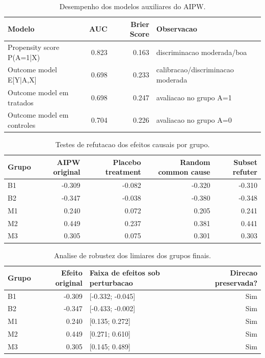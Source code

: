 \begin{table}[htbp]
\centering
\small
\caption{Desempenho dos modelos auxiliares do AIPW.}
\label{tab:nuisance_models}
\begin{tabular}{lrrl}
\toprule
Modelo & AUC & Brier Score & Observacao \\
\midrule
Propensity score P(A=1|X) & 0.823 & 0.163 & discriminacao moderada/boa \\
Outcome model E[Y|A,X] & 0.698 & 0.233 & calibracao/discriminacao moderada \\
Outcome model em tratados & 0.698 & 0.247 & avaliacao no grupo A=1 \\
Outcome model em controles & 0.704 & 0.226 & avaliacao no grupo A=0 \\
\bottomrule
\end{tabular}
\end{table}


\begin{table}[htbp]
\centering
\small
\caption{Testes de refutacao dos efeitos causais por grupo.}
\label{tab:refuters}
\begin{tabular}{lrrrr}
\toprule
Grupo & AIPW original & Placebo treatment & Random common cause & Subset refuter \\
\midrule
B1 & -0.309 & -0.082 & -0.320 & -0.310 \\
B2 & -0.347 & -0.038 & -0.380 & -0.348 \\
M1 & 0.240 & 0.072 & 0.205 & 0.241 \\
M2 & 0.449 & 0.237 & 0.381 & 0.441 \\
M3 & 0.305 & 0.075 & 0.301 & 0.303 \\
\bottomrule
\end{tabular}
\end{table}


\begin{table}[htbp]
\centering
\small
\caption{Analise de robustez dos limiares dos grupos finais.}
\label{tab:threshold_robustness}
\begin{tabular}{lrlr}
\toprule
Grupo & Efeito original & Faixa de efeitos sob perturbacao & Direcao preservada? \\
\midrule
B1 & -0.309 & [-0.332; -0.045] & Sim \\
B2 & -0.347 & [-0.433; -0.002] & Sim \\
M1 & 0.240 & [0.135; 0.272] & Sim \\
M2 & 0.449 & [0.271; 0.610] & Sim \\
M3 & 0.305 & [0.145; 0.489] & Sim \\
\bottomrule
\end{tabular}
\end{table}


